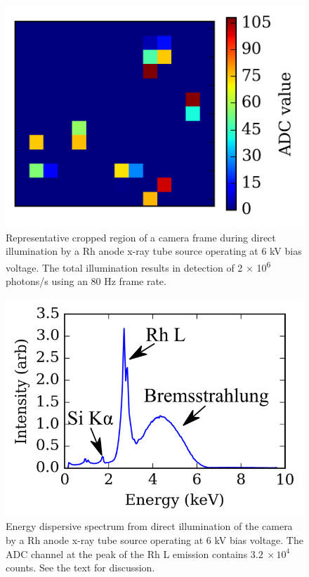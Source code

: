 \begin{figure}[h] \label{cmos23}
\caption{
Representative cropped region of a camera frame
during direct illumination by a Rh anode x-ray tube source operating at
6 kV bias voltage. The total illumination results in detection of 2 ×
10\textsuperscript{6} photons/s using an 80 Hz frame rate.
}
\centering
\includegraphics{NewCameraPaper_1.10.docx1502867018/media/image3.png}
\end{figure}


\begin{figure}[h] \label{cmos24}
\caption{
Energy dispersive spectrum from direct illumination
of the camera by a Rh anode x-ray tube source operating at 6 kV bias
voltage. The ADC channel at the peak of the Rh L emission contains
\(3.2\  \times 10^{4}\) counts. See the text for discussion.
}
\centering
\includegraphics{NewCameraPaper_1.10.docx1502867018/media/image4.png}
\end{figure}


